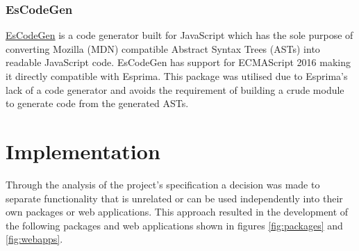 \documentclass{l4proj}
\begin{document}
\subsection{EsCodeGen }
\href{https://github.com/estools/escodegen#readme}{EsCodeGen} is a code generator built for JavaScript which has the sole purpose of converting Mozilla (MDN) compatible Abstract Syntax Trees (ASTs) into readable JavaScript code. EsCodeGen has support for ECMAScript 2016 making it directly compatible with Esprima. This package was utilised due to Esprima's lack of a code generator and avoids the requirement of building a crude module to generate code from the generated ASTs.

\chapter{Implementation}

\text Through the analysis of the project's specification a decision was made to separate functionality that is unrelated or can be used independently into their own packages or web applications. This approach resulted in the development of the following packages and web applications shown in figures \ref{fig:packages} and \ref{fig:webapps}.
\end{document}

